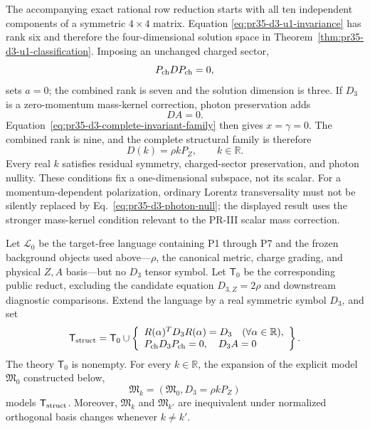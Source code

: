 The accompanying exact rational row reduction starts with all ten independent
components of a symmetric $4\times4$ matrix.  Equation
\eqref{eq:pr35-d3-u1-invariance} has rank six and therefore the four-dimensional
solution space in Theorem~\ref{thm:pr35-d3-u1-classification}.  Imposing an
unchanged charged sector,
\begin{equation}
 P_{\rm ch}DP_{\rm ch}=0,
 \label{eq:pr35-d3-charged-unchanged}
\end{equation}
sets $a=0$; the combined rank is seven and the solution dimension is three. If $D_3$ is a zero-momentum mass-kernel correction, photon preservation adds
\begin{equation}
 DA=0.
 \label{eq:pr35-d3-photon-null}
\end{equation}
Equation~\eqref{eq:pr35-d3-complete-invariant-family} then gives
$x=\gamma=0$.  The combined rank is nine, and the complete structural family
is therefore
\begin{equation}
 D(k)=\rho kP_Z,\qquad k\in\mathbb R.
 \label{eq:pr35-d3-all-real-k-family}
\end{equation}
Every real $k$ satisfies residual symmetry, charged-sector preservation, and
photon nullity.  These conditions fix a one-dimensional subspace, not its
scalar.  For a
momentum-dependent polarization, ordinary Lorentz transversality must not be
silently replaced by Eq.~\eqref{eq:pr35-d3-photon-null}; the displayed result
uses the stronger mass-kernel condition relevant to the PR-III scalar mass
correction.

\begin{theorem}
\label{thm:pr35-d3-common-reduct}
Let $\mathcal L_0$ be the target-free language containing P1 through P7 and the frozen background objects used above---$\rho$, the canonical metric, charge grading, and physical $Z,A$ basis---but no $D_3$ tensor symbol.  Let $\mathsf T_0$ be the corresponding public reduct, excluding the candidate equation $D_{3,Z}=2\rho$ and downstream diagnostic comparisons.  Extend the language by
a real symmetric symbol $D_3$, and set
\begin{equation}
 \mathsf T_{\rm struct}=\mathsf T_0\cup
 \left\{\begin{array}{l}
 R(\alpha)^TD_3R(\alpha)=D_3\quad(\forall\alpha\in\mathbb R),\\
 P_{\rm ch}D_3P_{\rm ch}=0,\quad D_3A=0
 \end{array}\right\}.
 \label{eq:pr35-d3-structural-theory}
\end{equation}
The theory $\mathsf T_0$ is nonempty.  For every $k\in\mathbb R$, the
expansion of the explicit model $\mathfrak M_0$ constructed below,
\begin{equation}
 \mathfrak M_k=(\mathfrak M_0,D_3=\rho kP_Z)
 \label{eq:pr35-d3-model-expansion}
\end{equation}
models $\mathsf T_{\rm struct}$.  Moreover, $\mathfrak M_k$ and
$\mathfrak M_{k'}$ are inequivalent under normalized orthogonal basis changes
whenever $k\ne k'$.
\end{theorem}

